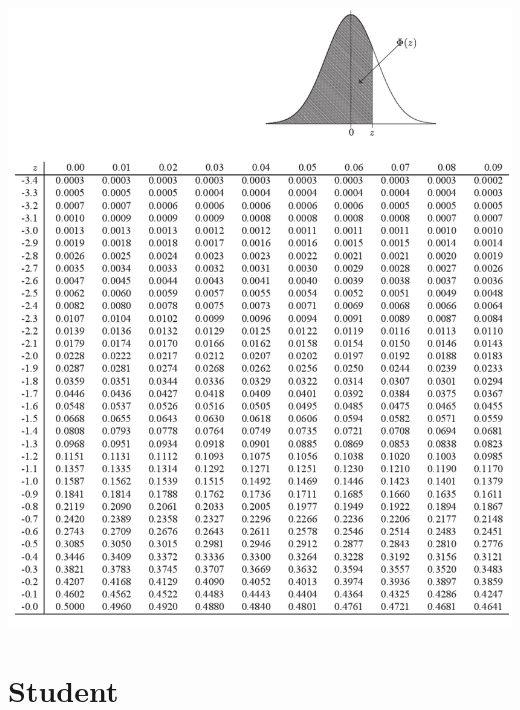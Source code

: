 \documentclass[11pt]{article}
\begin{document}
    \begin{minipage}{.99\textwidth}
        \centering
        \includegraphics[width = .99\textwidth]{img/tab_gaus2}
    \end{minipage}


    \section{Student}
\end{document}
